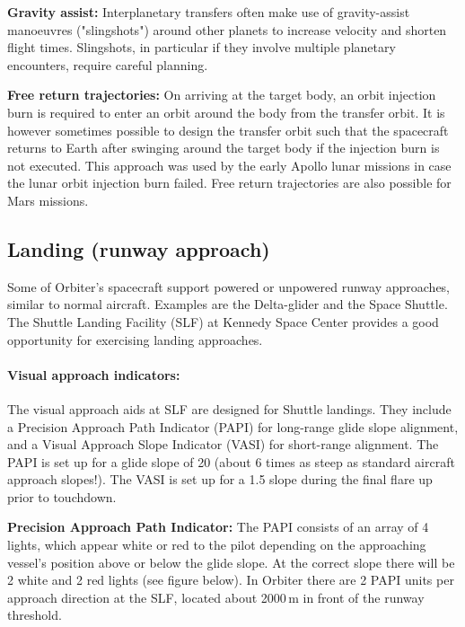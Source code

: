 \documentclass[Orbiter User Manual.tex]{subfiles}
\begin{document}
\textbf{Gravity assist:}
Interplanetary transfers often make use of gravity-assist manoeuvres
("slingshots") around other planets to increase velocity and shorten flight
times. Slingshots, in particular if they involve multiple planetary encounters,
require careful planning.

\textbf{Free return trajectories:}
On arriving at the target body, an orbit injection burn is required to enter an
orbit around the body from the transfer orbit. It is however sometimes possible
to design the transfer orbit such that the spacecraft returns to Earth after
swinging around the target body if the injection burn is not executed. This
approach was used by the early Apollo lunar missions in case the lunar orbit
injection burn failed. Free return trajectories are also possible for Mars
missions.


\subsection{Landing (runway approach)}
\label{ssec:basic_landing}
Some of Orbiter's spacecraft support powered or unpowered runway approaches,
similar to normal aircraft. Examples are the Delta-glider and the Space Shuttle.
The Shuttle Landing Facility (SLF) at Kennedy Space Center provides a good
opportunity for exercising landing approaches.

\paragraph{Visual approach indicators:}
The visual approach aids at SLF are designed for Shuttle landings. They include
a Precision Approach Path Indicator (PAPI) for long-range glide slope alignment,
and a Visual Approach Slope Indicator (VASI) for short-range alignment. The PAPI
is set up for a glide slope of 20\deg{} (about 6 times as steep as standard
aircraft approach slopes!). The VASI is set up for a 1.5\deg{} slope during the
final flare up prior to touchdown.

\textbf{Precision Approach Path Indicator:}
The PAPI consists of an array of 4 lights, which appear white or red to the
pilot depending on the approaching vessel's position above or below the glide
slope. At the correct slope there will be 2 white and 2 red lights (see figure
below). In Orbiter there are 2 PAPI units per approach direction at the SLF,
located about 2000\,m in front of the runway threshold.
\end{document}
